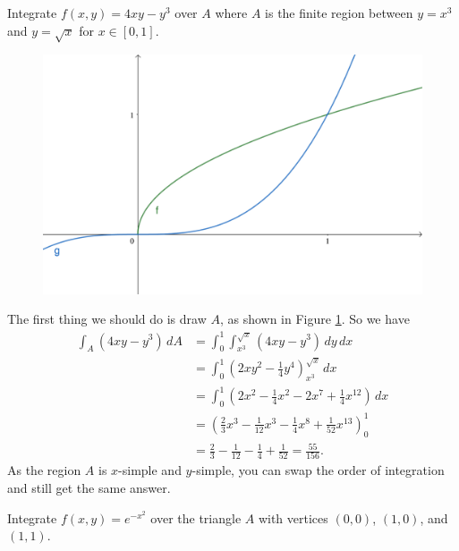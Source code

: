 
\begin{example}
    Integrate $f(x, y) = 4xy - y^3$ over $A$ where $A$ is the finite region
    between $y = x^3$ and $y = \sqrt x$ for $x \in [0, 1]$.
\end{example}

\begin{figure}[]
    \centering
    \includegraphics[width=0.8\linewidth]{images/fubini-ex-1.pdf}
    \caption{}
    \label{fig:fubini-ex-1}
\end{figure}

\begin{solution}
    The first thing we should do is draw $A$, as shown in Figure 
    \ref{fig:fubini-ex-1}.
    So we have
    \begin{align*}
        \int_A (4xy - y^3) \, dA
        &= \int_0^1 \int_{x^3}^{\sqrt x} (4xy - y^3) \, dy \, dx \\
        &= \int_0^1 \left(2xy^2 - \frac14y^4\right)^{\sqrt x}_{x^3} \, dx \\
        &= \int_0^1 (2x^2 - \frac14x^2 - 2x^7 + \frac14x^{12}) \, dx \\
        &= \left(\frac23x^3 -\frac1{12}x^3 - \frac14x^8 + 
            \frac1{52}x^{13}\right)_0^1 \\
        &= \frac23 - \frac1{12} - \frac14 + \frac1{52} = \frac{55}{156}.
    \end{align*}
    As the region $A$ is $x$-simple and $y$-simple,
    you can swap the order of integration and still get the same answer.
\end{solution}

\begin{example}
    Integrate $f(x, y) = e^{-x^2}$ over the triangle $A$ with
    vertices $(0,0)$, $(1,0)$, and $(1, 1)$.
\end{example}

